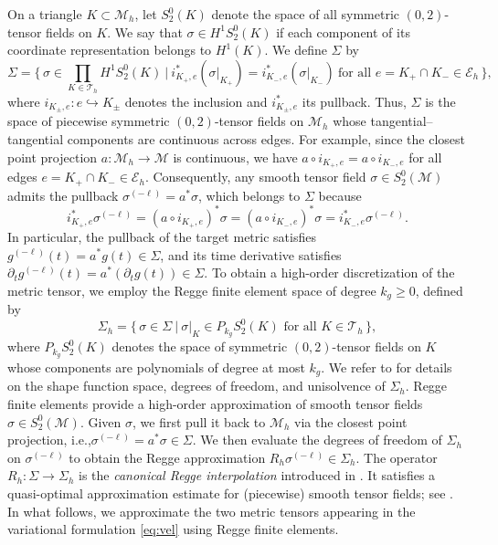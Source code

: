 \documentclass[11pt,a4paper,oneside,reqno]{amsart}
\theoremstyle{definition}
\theoremstyle{plain}
\numberwithin{theorem}{section}
\numberwithin{proposition}{section}
\numberwithin{lemma}{section}
\numberwithin{equation}{section}
\newcommand{\Man}{\mathcal{M}}
\begin{document}
On a triangle \(K\subset\Man_h\), let \(S_2^0(K)\) denote the space of all symmetric \((0,2)\)-tensor fields on \(K\).
We say that \(\sigma\in H^1 S_2^0(K)\) if each component of its coordinate representation belongs to \(H^1(K)\).
We define \(\Sigma\) by
\[
\Sigma = \Big\{\, \sigma \in \prod_{K\in\mathcal T_h} H^1 S^0_2(K) \ \Big|\ 
i_{K_+,e}^*(\sigma|_{K_+}) = i_{K_-,e}^*(\sigma|_{K_-})
\ \text{for all } e=K_+\cap K_- \in \mathcal E_h \,\Big\},
\]
where \(i_{K_{\pm},e}: e \hookrightarrow K_{\pm}\) denotes the inclusion and \(i_{K_{\pm},e}^*\) its pullback.
Thus, \(\Sigma\) is the space of piecewise symmetric \((0,2)\)-tensor fields on \(\Man_h\) whose tangential--tangential components are continuous across edges.
For example, since the closest point projection \(a:\Man_h\to\Man\) is continuous, we have
\(a\circ i_{K_+,e}=a\circ i_{K_-,e}\) for all edges \(e=K_+\cap K_-\in\mathcal E_h\).
Consequently, any smooth tensor field \(\sigma\in S_2^0(\Man)\) admits the pullback \(\sigma^{(-\ell)}=a^*\sigma\), which belongs to \(\Sigma\) because
\[
i_{K_+,e}^* \sigma^{(-\ell)} = (a \circ i_{K_+,e})^* \sigma
= (a \circ i_{K_-,e})^* \sigma = i_{K_-,e}^* \sigma^{(-\ell)}.
\]
In particular, the pullback of the target metric satisfies \(g^{(-\ell)}(t)=a^*g(t)\in\Sigma\), and its time derivative satisfies
\(\partial_t g^{(-\ell)}(t)=a^*(\partial_t g(t))\in\Sigma\). 
To obtain a high-order discretization of the metric tensor, we employ the Regge finite element space \cite{christiansen2004characterization,li2018regge} of degree \(k_g \ge 0\), defined by
\[
\Sigma_h = \big\{\, \sigma \in \Sigma \ \big|\ \sigma|_K \in P_{k_g} S_2^0(K) \text{ for all } K \in \mathcal{T}_h \,\big\},
\]
where \(P_{k_g}S_2^0(K)\) denotes the space of symmetric \((0,2)\)-tensor fields on \(K\) whose components are polynomials of degree at most \(k_g\).
We refer to \cite[Chapter~2]{li2018regge} for details on the shape function space, degrees of freedom, and unisolvence of $\Sigma_h$.  
Regge finite elements provide a high-order approximation of smooth tensor fields \(\sigma\in S_2^0(\Man)\).
Given \(\sigma\), we first pull it back to \(\Man_h\) via the closest point projection, i.e.,\(\sigma^{(-\ell)} = a^*\sigma \in \Sigma\).
We then evaluate the degrees of freedom of \(\Sigma_h\) on \(\sigma^{(-\ell)}\) to obtain the Regge approximation \(R_h\sigma^{(-\ell)} \in \Sigma_h\).
The operator \(R_h:\Sigma\to\Sigma_h\) is the \emph{canonical Regge interpolation} introduced in \cite[Section~2.3.2]{li2018regge}.
It satisfies a quasi-optimal approximation estimate for (piecewise) smooth tensor fields; see \cite[Theorem~2.5]{li2018regge}.
In what follows, we approximate the two metric tensors appearing in the variational formulation \eqref{eq:vel} using Regge finite elements.
\end{document}
